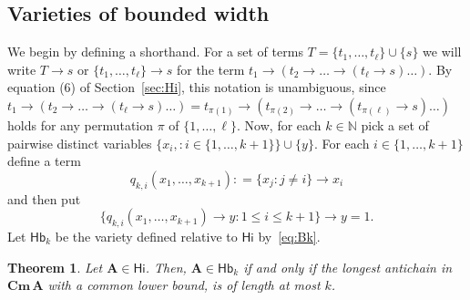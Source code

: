 \documentclass{amsart}
\newtheorem{theorem}{Theorem}[section]
\newcommand{\deq}{\mathrel{\mathop:}=}
\newcommand{\alg}[1]{\mathbf{#1}}
\newcommand{\var}[1]{\mathsf{#1}}
\newcommand{\Cm}[1]{\mathbf{Cm}\, #1}
\def\ra{\rightarrow}
\begin{document}
\subsection{Varieties of bounded width}
We begin by defining a shorthand. 
For a set of terms $T = \{t_1,\dots, t_\ell\}\cup\{s\}$ we will write
$T\ra s$ or $\{t_1,\dots, t_\ell\}\ra s$ for the term
$t_1\ra(t_2\ra \dots \ra (t_\ell\ra s)\dots)$.
By equation (6) of Section~\ref{sec:Hi}, this
notation is unambiguous, since
$t_1\ra(t_2\ra \dots \ra (t_\ell\ra s)\dots) = t_{\pi(1)}\ra(t_{\pi(2)}\ra \dots \ra
(t_{\pi(\ell)}\ra s)\dots)$ holds for any permutation $\pi$ of
$\{1,\dots,\ell\}$. 
Now, for each $k\in\mathbb{N}$
pick a set of pairwise distinct variables
$\bigl\{x_i,: i\in\{1,\dots,k+1\}\bigr\}\cup\{y\}$.
For each $i\in\{1,\dots,k+1\}$ define a term
$$
q_{k,i}(x_1,\dots,x_{k+1}) \deq \{x_j: j\neq i\}\ra x_i
$$
and then put
\begin{equation}\label{eq:Bk}\tag{$B_k$}
\{q_{k,i}(x_1,\dots,x_{k+1})\ra y: 1\leq i\leq k+1\}\ra y = 1.
\end{equation}
Let $\var{Hb}_k$ be the variety defined relative to $\var{Hi}$
by~\eqref{eq:Bk}. 

\begin{theorem}
Let $\alg{A}\in \var{Hi}$. Then, $\alg{A}\in\var{Hb}_k$ if and only if
the longest antichain in $\Cm{\alg{A}}$ with a common lower bound, is of length
at most $k$.   
\end{theorem}
\end{document}
